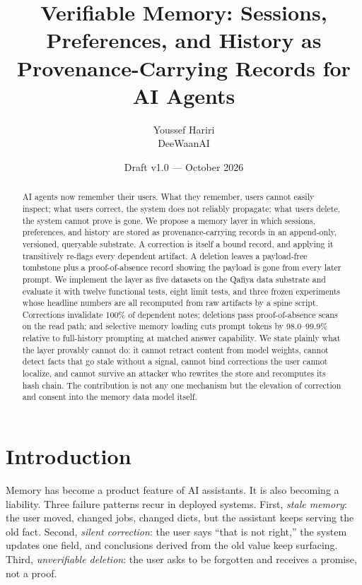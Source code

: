 \documentclass[11pt]{article}
\title{\textbf{Verifiable Memory: Sessions, Preferences, and History as\\ Provenance-Carrying Records for AI Agents}}
\author{Youssef Hariri\\ DeeWaanAI}
\date{Draft v1.0 --- October 2026}
\begin{document}
\maketitle

\begin{abstract}
\noindent AI agents now remember their users. What they remember, users cannot easily inspect; what users correct, the system does not reliably propagate; what users delete, the system cannot prove is gone. We propose a memory layer in which sessions, preferences, and history are stored as provenance-carrying records in an append-only, versioned, queryable substrate. A correction is itself a bound record, and applying it transitively re-flags every dependent artifact. A deletion leaves a payload-free tombstone plus a proof-of-absence record showing the payload is gone from every later prompt. We implement the layer as five datasets on the Qafiya data substrate and evaluate it with twelve functional tests, eight limit tests, and three frozen experiments whose headline numbers are all recomputed from raw artifacts by a spine script. Corrections invalidate 100\% of dependent notes; deletions pass proof-of-absence scans on the read path; and selective memory loading cuts prompt tokens by 98.0--99.9\% relative to full-history prompting at matched answer capability. We state plainly what the layer provably cannot do: it cannot retract content from model weights, cannot detect facts that go stale without a signal, cannot bind corrections the user cannot localize, and cannot survive an attacker who rewrites the store and recomputes its hash chain. The contribution is not any one mechanism but the elevation of correction and consent into the memory data model itself.
\end{abstract}

\section{Introduction}
Memory has become a product feature of AI assistants. It is also becoming a liability. Three failure patterns recur in deployed systems. First, \emph{stale memory}: the user moved, changed jobs, changed diets, but the assistant keeps serving the old fact. Second, \emph{silent correction}: the user says ``that is not right,'' the system updates one field, and conclusions derived from the old value keep surfacing. Third, \emph{unverifiable deletion}: the user asks to be forgotten and receives a promise, not a proof.
\end{document}
